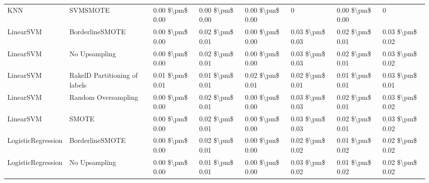 \begin{tabular}{llllllll}
                            KNN &                      SVMSMOTE & 0.00 \$\textbackslash pm\$ 0.00 &           0.00 \$\textbackslash pm\$ 0.00 &       0.00 \$\textbackslash pm\$ 0.00 &                      0 &                         0.00 \$\textbackslash pm\$ 0.00 &               0 \\
                      LinearSVM &               BorderlineSMOTE & 0.00 \$\textbackslash pm\$ 0.00 &           0.02 \$\textbackslash pm\$ 0.01 &       0.00 \$\textbackslash pm\$ 0.00 &        0.03 \$\textbackslash pm\$ 0.03 &                         0.02 \$\textbackslash pm\$ 0.01 & 0.03 \$\textbackslash pm\$ 0.02 \\
                      LinearSVM &                 No Upsampling & 0.00 \$\textbackslash pm\$ 0.00 &           0.02 \$\textbackslash pm\$ 0.01 &       0.00 \$\textbackslash pm\$ 0.00 &        0.03 \$\textbackslash pm\$ 0.03 &                         0.02 \$\textbackslash pm\$ 0.01 & 0.03 \$\textbackslash pm\$ 0.02 \\
                      LinearSVM & RakelD Partitioning of labels & 0.01 \$\textbackslash pm\$ 0.01 &           0.01 \$\textbackslash pm\$ 0.01 &       0.02 \$\textbackslash pm\$ 0.01 &        0.02 \$\textbackslash pm\$ 0.01 &                         0.01 \$\textbackslash pm\$ 0.01 & 0.03 \$\textbackslash pm\$ 0.01 \\
                      LinearSVM &           Random Oversampling & 0.00 \$\textbackslash pm\$ 0.00 &           0.02 \$\textbackslash pm\$ 0.01 &       0.00 \$\textbackslash pm\$ 0.00 &        0.03 \$\textbackslash pm\$ 0.03 &                         0.02 \$\textbackslash pm\$ 0.01 & 0.03 \$\textbackslash pm\$ 0.02 \\
                      LinearSVM &                         SMOTE & 0.00 \$\textbackslash pm\$ 0.00 &           0.02 \$\textbackslash pm\$ 0.01 &       0.00 \$\textbackslash pm\$ 0.00 &        0.03 \$\textbackslash pm\$ 0.03 &                         0.02 \$\textbackslash pm\$ 0.01 & 0.03 \$\textbackslash pm\$ 0.02 \\
             LogisticRegression &               BorderlineSMOTE & 0.00 \$\textbackslash pm\$ 0.00 &           0.02 \$\textbackslash pm\$ 0.01 &       0.00 \$\textbackslash pm\$ 0.00 &        0.02 \$\textbackslash pm\$ 0.02 &                         0.01 \$\textbackslash pm\$ 0.02 & 0.02 \$\textbackslash pm\$ 0.02 \\
             LogisticRegression &                 No Upsampling & 0.00 \$\textbackslash pm\$ 0.00 &           0.01 \$\textbackslash pm\$ 0.01 &       0.00 \$\textbackslash pm\$ 0.00 &        0.03 \$\textbackslash pm\$ 0.02 &                         0.01 \$\textbackslash pm\$ 0.02 & 0.02 \$\textbackslash pm\$ 0.02 \\

\end{tabular}
